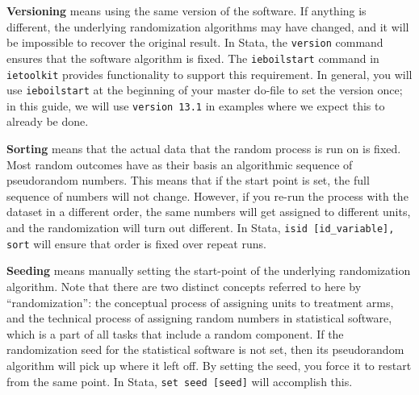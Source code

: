 \textbf{Versioning} means using the same version of the software.
If anything is different, the underlying randomization algorithms may have changed,
and it will be impossible to recover the original result.
In Stata, the \texttt{version} command ensures that the software algorithm is fixed.
The \texttt{ieboilstart} command in \texttt{ietoolkit} provides functionality to support this requirement.
In general, you will use \texttt{ieboilstart} at the beginning of your master do-file
to set the version once; in this guide, we will use
\texttt{version 13.1} in examples where we expect this to already be done.

\textbf{Sorting} means that the actual data that the random process is run on is fixed.
Most random outcomes have as their basis an algorithmic sequence of pseudorandom numbers.
This means that if the start point is set, the full sequence of numbers will not change.
However, if you re-run the process with the dataset in a different order,
the same numbers will get assigned to different units, and the randomization will turn out different.
In Stata, \texttt{isid [id\_variable], sort} will ensure that order is fixed over repeat runs.

\textbf{Seeding} means manually setting the start-point of the underlying randomization algorithm.
Note that there are two distinct concepts referred to here by ``randomization'':
the conceptual process of assigning units to treatment arms,
and the technical process of assigning random numbers in statistical software,
which is a part of all tasks that include a random component.
If the randomization seed for the statistical software is not set,
then its pseudorandom algorithm will pick up where it left off.
By setting the seed, you force it to restart from the same point.
In Stata, \texttt{set seed [seed]} will accomplish this.

